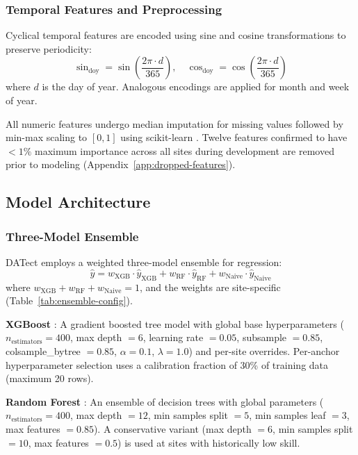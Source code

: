 \documentclass[preprint,12pt,authoryear]{elsarticle}
\begin{document}
\subsubsection{Temporal Features and Preprocessing}

Cyclical temporal features are encoded using sine and cosine transformations to preserve periodicity:
\begin{equation}
\sin_{\text{doy}} = \sin\!\left(\frac{2\pi \cdot d}{365}\right), \quad
\cos_{\text{doy}} = \cos\!\left(\frac{2\pi \cdot d}{365}\right)
\label{eq:cyclical}
\end{equation}
where $d$ is the day of year. Analogous encodings are applied for month and week of year.

All numeric features undergo median imputation for missing values followed by min-max scaling to $[0, 1]$ using scikit-learn \citep{Pedregosa2011}. Twelve features confirmed to have $< 1\%$ maximum importance across all sites during development are removed prior to modeling (Appendix~\ref{app:dropped-features}).

\subsection{Model Architecture}
\label{sec:model-selection}

\subsubsection{Three-Model Ensemble}

DATect employs a weighted three-model ensemble for regression:
\begin{equation}
\hat{y} = w_{\text{XGB}} \cdot \hat{y}_{\text{XGB}} + w_{\text{RF}} \cdot \hat{y}_{\text{RF}} + w_{\text{Naive}} \cdot \hat{y}_{\text{Naive}}
\label{eq:ensemble}
\end{equation}
where $w_{\text{XGB}} + w_{\text{RF}} + w_{\text{Naive}} = 1$, and the weights are site-specific (Table~\ref{tab:ensemble-config}).

\textbf{XGBoost} \citep{Chen2016}: A gradient boosted tree model with global base hyperparameters ($n_{\text{estimators}} = 400$, max depth $= 6$, learning rate $= 0.05$, subsample $= 0.85$, colsample\_bytree $= 0.85$, $\alpha = 0.1$, $\lambda = 1.0$) and per-site overrides. Per-anchor hyperparameter selection uses a calibration fraction of 30\% of training data (maximum 20 rows).

\textbf{Random Forest} \citep{Breiman2001}: An ensemble of decision trees with global parameters ($n_{\text{estimators}} = 400$, max depth $= 12$, min samples split $= 5$, min samples leaf $= 3$, max features $= 0.85$). A conservative variant (max depth $= 6$, min samples split $= 10$, max features $= 0.5$) is used at sites with historically low skill.
\end{document}
